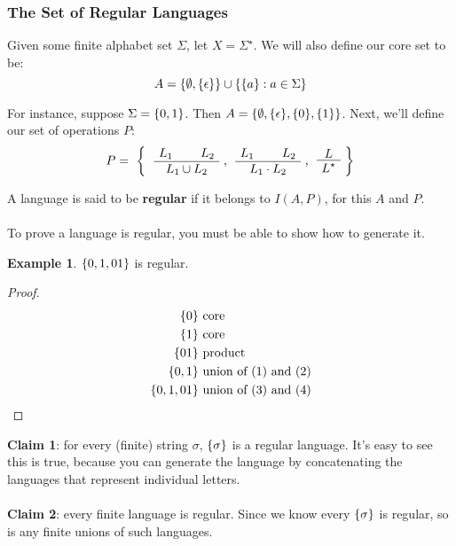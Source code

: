 \documentclass[]{article}
\DeclarePairedDelimiter{\set}{\lbrace}{\rbrace}
\theoremstyle{definition}
\newtheorem{ex}{Example}[section]
\begin{document}
        \subsubsection{The Set of Regular Languages}
          Given some finite alphabet set $\Sigma$, let $X = \Sigma^\star$. We will also define our core set to be:
          $$
            A = \set{\emptyset, \set{\epsilon}} \cup \set{ \set{a} : a \in \Sigma }
          $$

          For instance, suppose $\Sigma = \set{0, 1}$. Then $A = \set{ \emptyset, \set{ \epsilon }, \set{ 0 }, \set{ 1 } }$. Next, we'll define our set of operations $P$:
          $$
            P = \text{ \bigg\{ \AxiomC{$L_1$} \AxiomC{$L_2$} \BinaryInfC{$L_1 \cup L_2$} \DisplayProof, \AxiomC{$L_1$} \AxiomC{$L_2$} \BinaryInfC{$L_1 \cdot L_2$} \DisplayProof, \AxiomC{$L$} \UnaryInfC{$L^\star$} \DisplayProof \bigg\}}
          $$

          A language is said to be \textbf{regular} if it belongs to $I(A, P)$, for this $A$ and $P$.
          \\ \\
          To prove a language is regular, you must be able to show how to generate it.

          \begin{ex}
            $\set{0, 1, 01}$ is regular.
            \begin{proof}
              \begin{align}
                \set{0} &\text{ core} \\
                \set{1} &\text{ core} \\
                \set{01} &\text{ product} \\
                \set{0, 1} &\text{ union of (1) and (2)} \\
                \set{0, 1, 01} &\text{ union of (3) and (4)}
              \end{align}
              \setcounter{equation}{0}
            \end{proof}
          \end{ex}

          \textbf{Claim 1}: for every (finite) string $\sigma$, $\set{\sigma}$ is a regular language. It's easy to see this is true, because you can generate the language by concatenating the languages that represent individual letters.
          \\ \\
          \textbf{Claim 2}: every finite language is regular. Since we know every $\set{\sigma}$ is regular, so is any finite unions of such languages.
\end{document}
